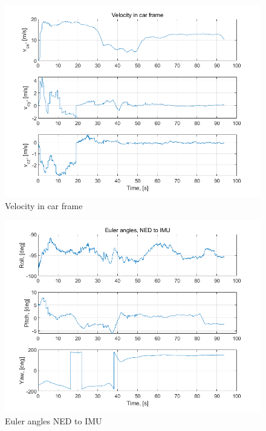 \documentclass[conference]{IEEEtran}
\begin{document}
\begin{figure}[htbp]
    \centerline{\includegraphics[width=1.0\columnwidth]{fig23.png}}
    \caption{Velocity in car frame}
\end{figure}

\begin{figure}[htbp]
    \centerline{\includegraphics[width=1.0\columnwidth]{fig24.png}}
    \caption{Euler angles NED to IMU}
\end{figure}
\end{document}

